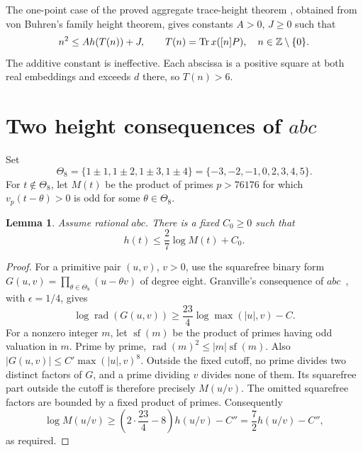 \documentclass[11pt,a4paper]{article}
\newtheorem{lemma}[theorem]{Lemma}
\DeclareMathOperator{\Tr}{Tr}\DeclareMathOperator{\Nm}{N}
\DeclareMathOperator{\rad}{rad}
\begin{document}
The one-point case of the proved aggregate trace-height theorem
\cite{Trace}, obtained from von Buhren's family height theorem, gives
constants $A>0$, $J\ge0$ such that
\begin{equation}\label{eq:traceheight}
 n^2\le A h(T(n))+J,\qquad
 T(n)=\Tr x([n]P),\quad n\in\Z\setminus\{0\}.
\end{equation}
The additive constant is ineffective. Each abscissa is a positive square
at both real embeddings and exceeds $d$ there, so $T(n)>6$.

\section{Two height consequences of $abc$}

Set
\[
 \Theta_8=\{1\pm1,1\pm2,1\pm3,1\pm4\}
          =\{-3,-2,-1,0,2,3,4,5\}.
\]
For $t\notin\Theta_8$, let $M(t)$ be the product of primes $p>76176$
for which $v_p(t-\theta)>0$ is odd for some $\theta\in\Theta_8$.

\begin{lemma}\label{lem:contact}
Assume rational $abc$. There is a fixed $C_0\ge0$ such that
\[
                         h(t)\le\frac27\log M(t)+C_0.
\]
\end{lemma}
\begin{proof}
For a primitive pair $(u,v)$, $v>0$, use the squarefree binary form
$G(u,v)=\prod_{\theta\in\Theta_8}(u-\theta v)$ of degree eight.
Granville's consequence of $abc$~\cite[Proposition~1]{Granville},
with $\epsilon=1/4$, gives
\[
 \log\rad(G(u,v))\ge\frac{23}{4}\log\max(|u|,v)-C.
\]
For a nonzero integer $m$, let $\operatorname{sf}(m)$ be the product
of primes having odd valuation in $m$. Prime by prime,
$\rad(m)^2\le |m|\operatorname{sf}(m)$.
Also $|G(u,v)|\le C'\max(|u|,v)^8$.
Outside the fixed cutoff, no prime divides two distinct factors of
$G$, and a prime dividing $v$ divides none of them. Its squarefree
part outside the cutoff is therefore precisely $M(u/v)$.
The omitted squarefree factors are bounded by a fixed product of primes.
Consequently
\[
 \log M(u/v)\ge\left(2\cdot\frac{23}{4}-8\right)h(u/v)-C''
                 =\frac72h(u/v)-C'',
\]
as required.
\end{proof}
\end{document}
